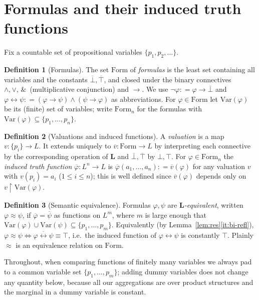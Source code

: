 \documentclass{amsart}
\theoremstyle{definition}
\newtheorem{definition}{Definition}
\theoremstyle{plain}
\newcommand{\eqdef}{\mathrel{\mathop:}=}
\newcommand{\bL}{\mathbf{L}}
\newcommand{\Form}{\mathrm{Form}}
\newcommand{\fto}{\rightarrow}
\newcommand{\fbi}{\leftrightarrow}
\newcommand{\odotop}{\,\&\,}
\newcommand{\Top}{\top}
\newcommand{\Bot}{\bot}
\begin{document}
\section{Formulas and their induced truth functions}\label{sec:formulas}

Fix a countable set of propositional variables $\{p_1,p_2,\dots\}$.

\begin{definition}[Formulas]\label{def:form}
The set $\Form$ of \emph{formulas} is the least set containing all variables and
the constants $\overline\Bot,\overline\Top$, and closed under the binary
connectives $\wedge,\vee,\odotop$ (multiplicative conjunction) and $\fto$.  We use
$\neg\varphi\eqdef\varphi\fto\overline\Bot$ and
$\varphi\fbi\psi\eqdef(\varphi\fto\psi)\wedge(\psi\fto\varphi)$ as abbreviations.
For $\varphi\in\Form$ let $\mathrm{Var}(\varphi)$ be its (finite) set of variables;
write $\Form_n$ for the formulas with $\mathrm{Var}(\varphi)\subseteq\{p_1,\dots,p_n\}$.
\end{definition}

\begin{definition}[Valuations and induced functions]\label{def:val}
A \emph{valuation} is a map $v:\{p_i\}\to L$.  It extends uniquely to
$\overline v:\Form\to L$ by interpreting each connective by the corresponding
operation of $\bL$ and $\overline\Bot,\overline\Top$ by $\Bot,\Top$.  For
$\varphi\in\Form_n$ the \emph{induced truth function}
$\overline\varphi:L^n\to L$ is
$\overline\varphi(a_1,\dots,a_n)\eqdef\overline v(\varphi)$ for any valuation $v$
with $v(p_i)=a_i$ ($1\le i\le n$); this is well defined since
$\overline v(\varphi)$ depends only on $v\restriction\mathrm{Var}(\varphi)$.
\end{definition}

\begin{definition}[Semantic equivalence]\label{def:eqv}
Formulas $\varphi,\psi$ are \emph{$\bL$-equivalent}, written
$\varphi\approx\psi$, if $\overline\varphi=\overline\psi$ as functions on
$L^{m}$, where $m$ is large enough that
$\mathrm{Var}(\varphi)\cup\mathrm{Var}(\psi)\subseteq\{p_1,\dots,p_m\}$.
Equivalently (by Lemma~\ref{lem:res}\eqref{it:bi-refl}),
$\varphi\approx\psi \iff \overline{\varphi\fbi\psi}\equiv\Top$, i.e.\ the induced
function of $\varphi\fbi\psi$ is constantly $\Top$.  Plainly $\approx$ is an
equivalence relation on $\Form$.
\end{definition}

Throughout, when comparing functions of finitely many variables we always pad to
a common variable set $\{p_1,\dots,p_m\}$; adding dummy variables does not change
any quantity below, because all our aggregations are over product structures and
the marginal in a dummy variable is constant.
\end{document}
